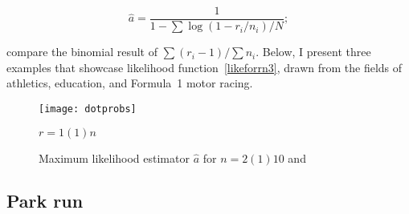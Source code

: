 \documentclass[article]{ajs}
\begin{document}
\begin{equation}
  \hat{a} =   \frac{1}{1-\sum\log(1-r_i/n_i)/N};
\end{equation}

compare the binomial result of $\sum(r_i-1)/\sum n_i$.  Below, I
present three examples that showcase likelihood
function~\ref{likeforrn3}, drawn from the fields of athletics,
education, and Formula~1 motor racing.

\begin{figure}[t]
  \begin{centering}
\texttt{[image: dotprobs]}  %
\caption{Maximum likelihood estimator $\hat{a}$ for $n=2(1)10$
  and\label{dotprobs}} $r=1(1)n$
\end{centering}
\end{figure}

% 
% 

\subsection{Park run}
\end{document}

